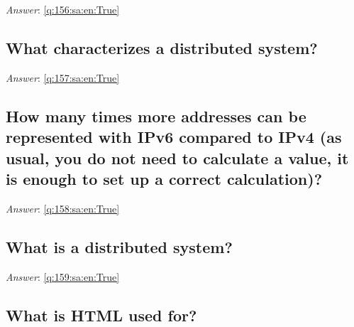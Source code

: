 \documentclass[a4paper,11pt,oneside]{article}
\begin{document}
\begin{sloppypar}
\textit{Answer}: \autoref{q:156:sa:en:True}



\subsection{What characterizes a distributed system?}

\label{q:157:sa:en:False}

\vspace{2cm}

\noindent\makebox[\textwidth]{\hrulefill}

\vspace{1cm}

\textit{Answer}: \autoref{q:157:sa:en:True}



\subsection{How many times more addresses can be represented with IPv6 compared to IPv4 (as usual, you do not need to calculate a value, it is enough to set up a correct calculation)?}

\label{q:158:sa:en:False}

\vspace{2cm}

\noindent\makebox[\textwidth]{\hrulefill}

\vspace{1cm}

\textit{Answer}: \autoref{q:158:sa:en:True}



\subsection{What is a distributed system?}

\label{q:159:sa:en:False}

\vspace{2cm}

\noindent\makebox[\textwidth]{\hrulefill}

\vspace{1cm}

\textit{Answer}: \autoref{q:159:sa:en:True}



\subsection{What is HTML used for?}


\end{sloppypar}
\end{document}
